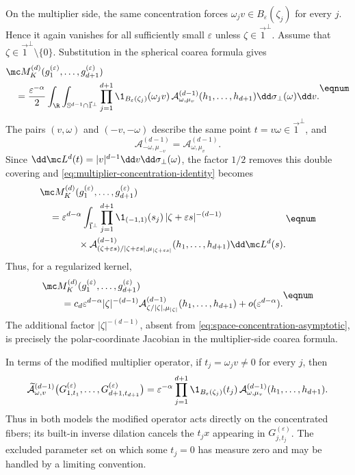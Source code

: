 On the multiplier side, the same concentration forces
\(\omega_jv\in B_\varepsilon(\zeta_j)\) for every \(j\).  Hence it again
vanishes for all sufficiently small \(\varepsilon\) unless
\(\zeta\in\vec1^\perp\).  Assume that
\(\zeta\in\vec1^\perp\setminus\{0\}\).  Substitution in the spherical
coarea formula gives
\[
\begin{aligned}
  &\mc M_K^{(d)}
  (g_1^{(\varepsilon)},\ldots,g_{d+1}^{(\varepsilon)})\\
  &\quad=
  \frac{\varepsilon^{-\alpha}}2
  \int_\R\int_{\mathbb S^{d-1}\cap\vec1^\perp}
  \prod_{j=1}^{d+1}
  \1_{B_\varepsilon(\zeta_j)}(\omega_jv)\,
  \mathcal A_{\omega,\mu_v}^{(d-1)}
  (h_1,\ldots,h_{d+1})
  \dd\sigma_\perp(\omega)\dd v.
\end{aligned}
\eqnum \label{eq:multiplier-concentration-identity}
\]
The pairs \((v,\omega)\) and \((-v,-\omega)\) describe the same point
\(t=v\omega\in\vec1^\perp\), and
\[
  \mathcal A_{-\omega,\mu_{-v}}^{(d-1)}
  =\mathcal A_{\omega,\mu_v}^{(d-1)}.
\]
Since
\(\dd\mc L^d(t)=|v|^{d-1}\dd v\dd\sigma_\perp(\omega)\), the factor
\(1/2\) removes this double covering and \eqref{eq:multiplier-concentration-identity}
becomes
\[
\begin{aligned}
  &\mc M_K^{(d)}
  (g_1^{(\varepsilon)},\ldots,g_{d+1}^{(\varepsilon)})\\
  &\quad=
  \varepsilon^{d-\alpha}
  \int_{\vec1^\perp}
  \prod_{j=1}^{d+1}\1_{(-1,1)}(s_j)\,
  |\zeta+\varepsilon s|^{-(d-1)}\\
  &\qquad\qquad\times
  \mathcal A_{
    (\zeta+\varepsilon s)/|\zeta+\varepsilon s|,
    \mu_{|\zeta+\varepsilon s|}
  }^{(d-1)}
  (h_1,\ldots,h_{d+1})
  \dd\mc L^d(s).
\end{aligned}
\eqnum \label{eq:multiplier-concentration-polar-identity}
\]
Thus, for a regularized kernel,
\[
\begin{aligned}
  &\mc M_K^{(d)}
  (g_1^{(\varepsilon)},\ldots,g_{d+1}^{(\varepsilon)})\\
  &\qquad=
  c_d\varepsilon^{d-\alpha}|\zeta|^{-(d-1)}
  \mathcal A_{\zeta/|\zeta|,\mu_{|\zeta|}}^{(d-1)}
  (h_1,\ldots,h_{d+1})
  +o(\varepsilon^{d-\alpha}).
\end{aligned}
\eqnum \label{eq:multiplier-concentration-asymptotic}
\]
The additional factor \(|\zeta|^{-(d-1)}\), absent from
\eqref{eq:space-concentration-asymptotic}, is precisely the polar-coordinate
Jacobian in the multiplier-side coarea formula.

In terms of the modified multiplier operator, if
\(t_j=\omega_jv\ne0\) for every \(j\), then
\[
  \widetilde{\mathcal A}_{\omega,v}^{(d-1)}
  \bigl(
    G_{1,t_1}^{(\varepsilon)},\ldots,
    G_{d+1,t_{d+1}}^{(\varepsilon)}
  \bigr)
  =
  \varepsilon^{-\alpha}
  \prod_{j=1}^{d+1}\1_{B_\varepsilon(\zeta_j)}(t_j)\,
  \mathcal A_{\omega,\mu_v}^{(d-1)}
  (h_1,\ldots,h_{d+1}).
\]
Thus in both models the modified operator acts directly on the concentrated
fibers; its built-in inverse dilation cancels the \(t_jx\) appearing in
\(G_{j,t_j}^{(\varepsilon)}\).
The excluded parameter set on which some
\(t_j=0\) has measure zero and may be handled by a limiting convention.

